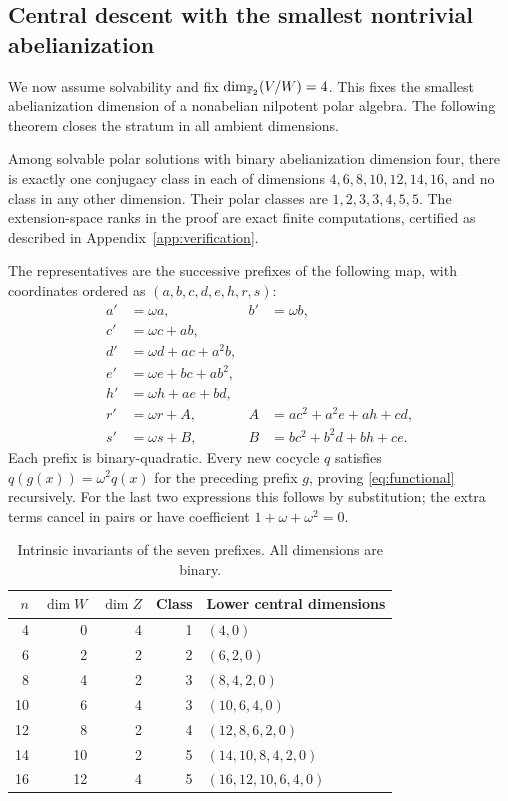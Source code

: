 \subsection{Central descent with the smallest nontrivial abelianization}

We now assume solvability and fix \(\dim_{\mathbb F_2}(V/W)=4\).
This fixes the smallest abelianization dimension of a nonabelian
nilpotent polar algebra. The following theorem closes the stratum in
all ambient dimensions.

\begin{theorem}\label{thm:seven-chain}
Among solvable polar solutions with binary abelianization dimension four,
there is exactly one conjugacy class in each of dimensions
\(4,6,8,10,12,14,16\), and no class in any other dimension.
Their polar classes are \(1,2,3,3,4,5,5\).
The extension-space ranks in the proof are exact finite computations,
certified as described in Appendix~\ref{app:verification}.
\end{theorem}

The representatives are the successive prefixes of the following map,
with coordinates ordered as \((a,b,c,d,e,h,r,s)\):
\begin{equation}\label{eq:seven-coordinates}
\begin{aligned}
 a'&=\omega a, &b'&=\omega b,\\
 c'&=\omega c+ab,\\
 d'&=\omega d+ac+a^2b,\\
 e'&=\omega e+bc+ab^2,\\
 h'&=\omega h+ae+bd,\\
 r'&=\omega r+A,& A&=ac^2+a^2e+ah+cd,\\
 s'&=\omega s+B,& B&=bc^2+b^2d+bh+ce.
\end{aligned}
\end{equation}
Each prefix is binary-quadratic. Every new cocycle \(q\) satisfies
\(q(g(x))=\omega^2q(x)\) for the preceding prefix \(g\), proving
\eqref{eq:functional} recursively. For the last two expressions this
follows by substitution; the extra terms cancel in pairs or have
coefficient \(1+\omega+\omega^2=0\).

\begin{table}[ht]
\centering
\caption{Intrinsic invariants of the seven prefixes. All dimensions are binary.}
\label{tab:chain-invariants}
\begin{tabular}{@{}rrrrl@{}}
\toprule
\(n\)&\(\dim W\)&\(\dim Z\)&Class&Lower central dimensions\\
\midrule
4&0&4&1&\((4,0)\)\\
6&2&2&2&\((6,2,0)\)\\
8&4&2&3&\((8,4,2,0)\)\\
10&6&4&3&\((10,6,4,0)\)\\
12&8&2&4&\((12,8,6,2,0)\)\\
14&10&2&5&\((14,10,8,4,2,0)\)\\
16&12&4&5&\((16,12,10,6,4,0)\)\\
\bottomrule
\end{tabular}
\end{table}

